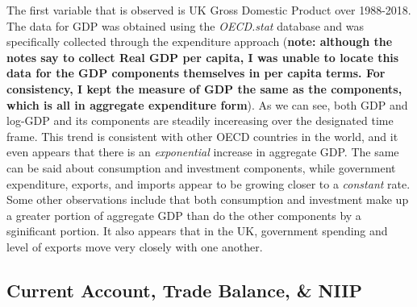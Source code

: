 \documentclass[12pt]{article}
\begin{document}
\begin{flushleft}
The first variable that is observed is UK Gross Domestic Product over 1988-2018. The data for GDP was obtained using the \textit{OECD.stat} database and was specifically collected through the expenditure approach (\textbf{note: although the notes say to collect Real GDP per capita, I was unable to locate this data for the GDP components themselves in per capita terms. For consistency, I kept the measure of GDP the same as the components, which is all in aggregate expenditure form}). 
\break
\linebreak
As we can see, both GDP and log-GDP and its components are steadily incereasing over the designated time frame. This trend is consistent with other OECD countries in the world, and it even appears that there is an \textit{exponential} increase in aggregate GDP. The same can be said about consumption and investment components, while government expenditure, exports, and imports appear to be growing closer to a \textit{constant} rate.
\break
\linebreak
Some other observations include that both consumption and investment make up a greater portion of aggregate GDP than do the other components by a sginificant portion. It also appears that in the UK, government spending and level of exports move very closely with one another.
\end{flushleft}

\newpage

\subsection{Current Account, Trade Balance, \& NIIP}
\end{document}
